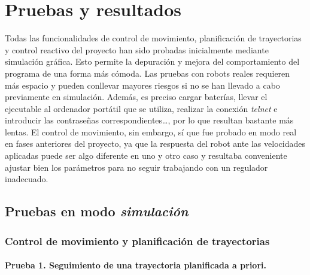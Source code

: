 %
%
%


\section{Pruebas y resultados}

Todas las funcionalidades de control de movimiento, planificación de trayectorias y control reactivo del proyecto han sido probadas inicialmente mediante simulación gráfica. Esto permite la depuración y mejora del comportamiento del programa de una forma más cómoda. Las pruebas con robots reales requieren más espacio y pueden conllevar mayores riesgos si no se han llevado a cabo previamente en simulación. Además, es preciso cargar baterías, llevar el ejecutable al ordenador portátil que se utiliza, realizar la conexión \emph{telnet} e introducir las contraseñas correspondientes\ldots, por lo que resultan bastante más lentas. El control de movimiento, sin embargo, sí que fue probado en modo real en fases anteriores del proyecto, ya que la respuesta del robot ante las velocidades aplicadas puede ser algo diferente en uno y otro caso y resultaba conveniente ajustar bien los parámetros para no seguir trabajando con un regulador inadecuado.

\subsection{Pruebas en modo \emph{simulación}}

\subsubsection{Control de movimiento y planificación de trayectorias}

\paragraph{Prueba 1. Seguimiento de una trayectoria planificada a priori.}\  %

